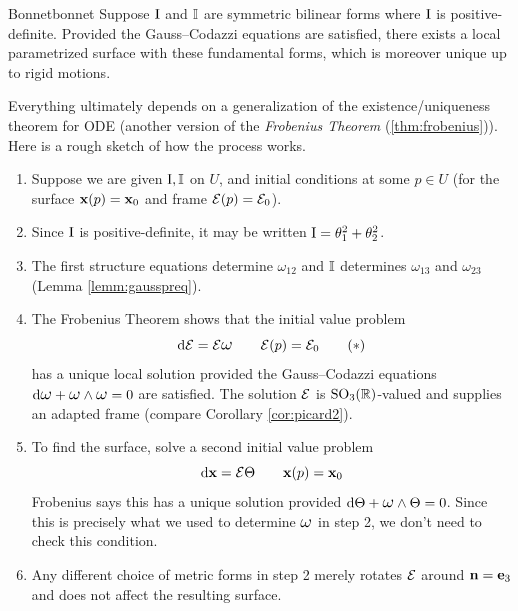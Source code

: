 

\begin{thm}{Bonnet}{bonnet}
	Suppose $\mathrm{I}$ and $\mathbb{I}$ are symmetric bilinear forms where $\mathrm{I}$ is positive-definite. Provided the Gauss--Codazzi equations are satisfied, there exists a local parametrized surface with these fundamental forms, which is moreover unique up to rigid motions.
\end{thm}

Everything ultimately depends on a generalization of the existence/uniqueness theorem for ODE (another version of the \emph{Frobenius Theorem} (\ref{thm:frobenius})). Here is a rough sketch of how the process works. 

\begin{enumerate}
  \item Suppose we are given $\mathrm{I},\mathbb{I}$ on $U$, and initial conditions at some $p\in U$ (for the surface ${\mathbf{x}}(p)={\mathbf{x}}_0$ and frame $\mathcal{E}(p)=\mathcal{E}_0$).
  \item Since $\mathrm{I}$ is positive-definite, it may be written $\mathrm{I}=\theta_1^2+\theta_2^2$.
  \item The first structure equations determine $\omega_{12}$ and $\mathbb{I}$ determines $\omega_{13}$ and $\omega_{23}$ (Lemma \ref{lemm:gausspreq}).
  \item The Frobenius Theorem shows that the initial value problem
  \[
  	\D\cE=\cE\lomega\qquad \cE(p)=\cE_0	\tag{$\ast$}
  \]
  has a unique local solution provided the Gauss--Codazzi equations $\D\lomega+\lomega\wedge\lomega=0$ are satisfied. The solution $\mathcal{E}$ is $\mathrm{SO}_3(\mathbb{R})$-valued and supplies an adapted frame (compare Corollary \ref{cor:picard2}).
  \item To find the surface, solve a second initial value problem
 	\[
  	\mathrm{d}{\mathbf{x}}=\mathcal{E}\Theta\qquad {\mathbf{x}}(p)={\mathbf{x}}_0
  \]
  Frobenius says this has a unique solution provided $\D\Theta+\lomega\wedge\Theta=0$. Since this is precisely what we used to determine $\lomega$ in step 2, we don't need to check this condition.
  \item Any different choice of metric forms in step 2 merely rotates $\mathcal{E}$ around ${\mathbf{n}}={\mathbf{e}}_3$ and does not affect the resulting surface.
\end{enumerate}

